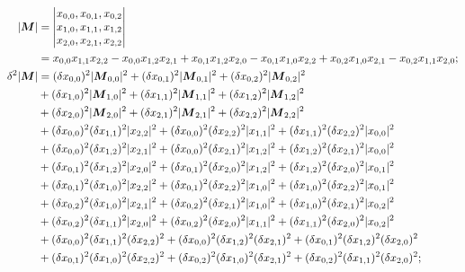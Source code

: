 \documentclass[twoside]{article}
\numberwithin{equation}{section}
\begin{document}
\begin{align*}
|\protect{\textrm{\boldmath $M$}}| &= \left| \begin{matrix} x_{0,0}, x_{0,1}, x_{0,2} \\ x_{1,0}, x_{1,1}, x_{1,2} \\ x_{2,0}, x_{2,1}, x_{2,2} \end{matrix} \right| \\
&= x_{0,0} x_{1,1} x_{2,2} - x_{0,0} x_{1,2} x_{2,1} 
   	+ x_{0,1} x_{1,2} x_{2,0} - x_{0,1} x_{1,0} x_{2,2}
    + x_{0,2} x_{1,0} x_{2,1} -  x_{0,2} x_{1,1} x_{2,0}; \\
\delta^2 |\protect{\textrm{\boldmath $M$}}| &= (\delta x_{0,0})^2 |\protect{\textrm{\boldmath $M$}}_{0,0}|^2 + (\delta x_{0,1})^2 |\protect{\textrm{\boldmath $M$}}_{0,1}|^2 + (\delta x_{0,2})^2 |\protect{\textrm{\boldmath $M$}}_{0,2}|^2 \\
  &+ (\delta x_{1,0})^2 |\protect{\textrm{\boldmath $M$}}_{1,0}|^2 + (\delta x_{1,1})^2 |\protect{\textrm{\boldmath $M$}}_{1,1}|^2 + (\delta x_{1,2})^2 |\protect{\textrm{\boldmath $M$}}_{1,2}|^2 \\
  &+ (\delta x_{2,0})^2 |\protect{\textrm{\boldmath $M$}}_{2,0}|^2 + (\delta x_{2,1})^2 |\protect{\textrm{\boldmath $M$}}_{2,1}|^2 + (\delta x_{2,2})^2 |\protect{\textrm{\boldmath $M$}}_{2,2}|^2 \\
  &+ (\delta x_{0,0})^2 (\delta x_{1,1})^2 |x_{2,2}|^2 + (\delta x_{0,0})^2 (\delta x_{2,2})^2 |x_{1,1}|^2 + (\delta x_{1,1})^2 (\delta x_{2,2})^2 |x_{0,0}|^2 \\
  &+ (\delta x_{0,0})^2 (\delta x_{1,2})^2 |x_{2,1}|^2 + (\delta x_{0,0})^2 (\delta x_{2,1})^2 |x_{1,2}|^2 + (\delta x_{1,2})^2 (\delta x_{2,1})^2 |x_{0,0}|^2 \\
  &+ (\delta x_{0,1})^2 (\delta x_{1,2})^2 |x_{2,0}|^2 + (\delta x_{0,1})^2 (\delta x_{2,0})^2 |x_{1,2}|^2 + (\delta x_{1,2})^2 (\delta x_{2,0})^2 |x_{0,1}|^2 \\
  &+ (\delta x_{0,1})^2 (\delta x_{1,0})^2 |x_{2,2}|^2 + (\delta x_{0,1})^2 (\delta x_{2,2})^2 |x_{1,0}|^2 + (\delta x_{1,0})^2 (\delta x_{2,2})^2 |x_{0,1}|^2 \\
  &+ (\delta x_{0,2})^2 (\delta x_{1,0})^2 |x_{2,1}|^2 + (\delta x_{0,2})^2 (\delta x_{2,1})^2 |x_{1,0}|^2 + (\delta x_{1,0})^2 (\delta x_{2,1})^2 |x_{0,2}|^2 \\
  &+ (\delta x_{0,2})^2 (\delta x_{1,1})^2 |x_{2,0}|^2 + (\delta x_{0,2})^2 (\delta x_{2,0})^2 |x_{1,1}|^2 + (\delta x_{1,1})^2 (\delta x_{2,0})^2 |x_{0,2}|^2 \\
  &+ (\delta x_{0,0})^2 (\delta x_{1,1})^2 (\delta x_{2,2})^2 + (\delta x_{0,0})^2 (\delta x_{1,2})^2 (\delta x_{2,1})^2 + (\delta x_{0,1})^2 (\delta x_{1,2})^2 (\delta x_{2,0})^2 \\
  &+ (\delta x_{0,1})^2 (\delta x_{1,0})^2 (\delta x_{2,2})^2 + (\delta x_{0,2})^2 (\delta x_{1,0})^2 (\delta x_{2,1})^2 + (\delta x_{0,2})^2 (\delta x_{1,1})^2 (\delta x_{2,0})^2;\\
\end{align*}
\end{document}
